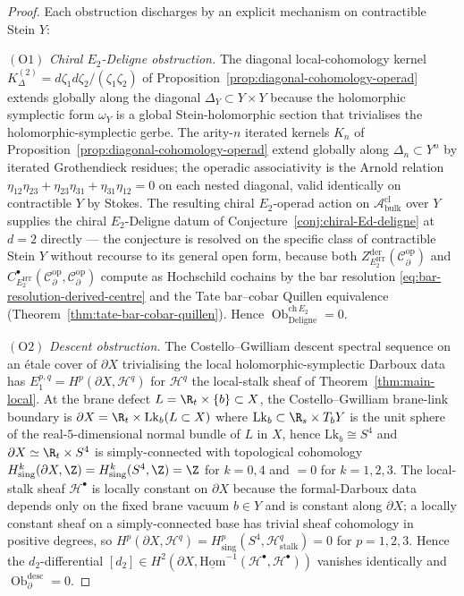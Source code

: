 \begin{proof}
Each obstruction discharges by an explicit mechanism on contractible
Stein \(Y\):

\((\mathrm{O1})\) \emph{Chiral \(E_2\)-Deligne obstruction.}
The diagonal local-cohomology kernel
\(K^{(2)}_\Delta=d\zeta_1d\zeta_2/(\zeta_1\zeta_2)\) of
Proposition~\ref{prop:diagonal-cohomology-operad} extends globally
along the diagonal \(\Delta_Y\subset Y\times Y\) because the
holomorphic symplectic form \(\omega_Y\) is a global Stein-holomorphic
section that trivialises the holomorphic-symplectic gerbe.  The
arity-\(n\) iterated kernels \(K_n\) of
Proposition~\ref{prop:diagonal-cohomology-operad} extend globally
along \(\Delta_n\subset Y^n\) by iterated Grothendieck residues; the
operadic associativity is the Arnold relation
\(\eta_{12}\eta_{23}+\eta_{23}\eta_{31}+\eta_{31}\eta_{12}=0\) on
each nested diagonal, valid identically on contractible \(Y\) by
Stokes.  The resulting chiral \(E_2\)-operad action on
\(\mathcal A^{\mathrm{cl}}_{\mathrm{bulk}}\) over \(Y\) supplies the
chiral \(E_2\)-Deligne datum of
Conjecture~\ref{conj:chiral-Ed-deligne} at \(d=2\) directly --- the
conjecture is resolved on the specific class of contractible Stein
\(Y\) without recourse to its general open form, because both
\(Z^{\mathrm{der}}_{E_2^{\mathrm{HT}}}(\mathcal C^{\mathrm{op}}_\partial)\)
and \(C^\bullet_{E_2^{\mathrm{HT}}}(\mathcal C^{\mathrm{op}}_\partial,
\mathcal C^{\mathrm{op}}_\partial)\) compute as Hochschild cochains by
the bar resolution \eqref{eq:bar-resolution-derived-centre} and the
Tate bar--cobar Quillen equivalence
(Theorem~\ref{thm:tate-bar-cobar-quillen}).  Hence
\(\operatorname{Ob}^{\mathrm{ch}\,E_2}_{\mathrm{Deligne}}=0\).

\((\mathrm{O2})\) \emph{Descent obstruction.}
The Costello--Gwilliam descent spectral sequence on an étale cover
of \(\partial X\) trivialising the local holomorphic-symplectic Darboux
data has \(E_1^{p,q}=H^p(\partial X,\mathcal H^q)\) for
\(\mathcal H^q\) the local-stalk sheaf of
Theorem~\ref{thm:main-local}.  At the brane defect
\(L=\R_t\times\{b\}\subset X\), the Costello--Gwilliam brane-link
boundary is
\(\partial X=\R_t\times\mathrm{Lk}_b(L\subset X)\) where
\(\mathrm{Lk}_b\subset\R_s\times T_bY\) is the unit sphere of the
real-\(5\)-dimensional normal bundle of \(L\) in \(X\), hence
\(\mathrm{Lk}_b\cong S^4\) and \(\partial X\simeq\R_t\times S^4\) is
simply-connected with topological cohomology
\(H^k_{\mathrm{sing}}(\partial X,\Z)=H^k_{\mathrm{sing}}(S^4,\Z)=\Z\)
for \(k=0,4\) and \(=0\) for \(k=1,2,3\).  The local-stalk sheaf
\(\mathcal H^\bullet\) is locally constant on \(\partial X\) because
the formal-Darboux data depends only on the fixed brane vacuum
\(b\in Y\) and is constant along \(\partial X\); a locally constant
sheaf on a simply-connected base has trivial sheaf cohomology in
positive degrees, so
\(H^p(\partial X,\mathcal H^q)=
H^p_{\mathrm{sing}}(S^4,\mathcal H^q_{\mathrm{stalk}})=0\) for
\(p=1,2,3\).  Hence the \(d_2\)-differential
\([d_2]\in H^2(\partial X,\underline{\mathrm{Hom}}^{-1}(\mathcal
H^\bullet,\mathcal H^\bullet))\) vanishes identically and
\(\operatorname{Ob}^{\mathrm{desc}}_\partial=0\).


\end{proof}
